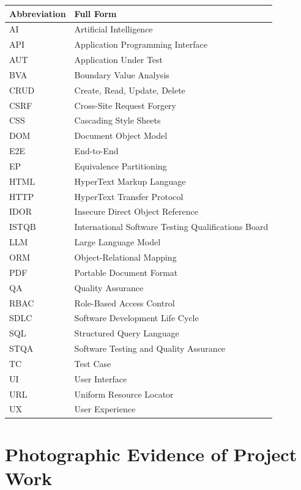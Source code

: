 \documentclass{InternshipReport}
\begin{document}
\begin{table}[H]
\centering
\begin{tabular}{p{} p{}}
\toprule
\textbf{Abbreviation} & \textbf{Full Form} \\
\midrule
AI & Artificial Intelligence \\
API & Application Programming Interface \\
AUT & Application Under Test \\
BVA & Boundary Value Analysis \\
CRUD & Create, Read, Update, Delete \\
CSRF & Cross-Site Request Forgery \\
CSS & Cascading Style Sheets \\
DOM & Document Object Model \\
E2E & End-to-End \\
EP & Equivalence Partitioning \\
HTML & HyperText Markup Language \\
HTTP & HyperText Transfer Protocol \\
IDOR & Insecure Direct Object Reference \\
ISTQB & International Software Testing Qualifications Board \\
LLM & Large Language Model \\
ORM & Object-Relational Mapping \\
PDF & Portable Document Format \\
QA & Quality Assurance \\
RBAC & Role-Based Access Control \\
SDLC & Software Development Life Cycle \\
SQL & Structured Query Language \\
STQA & Software Testing and Quality Assurance \\
TC & Test Case \\
UI & User Interface \\
URL & Uniform Resource Locator \\
UX & User Experience \\
\bottomrule
\end{tabular}
\end{table}


\clearpage
\appendix
\chapter{Photographic Evidence of Project Work}
\end{document}
